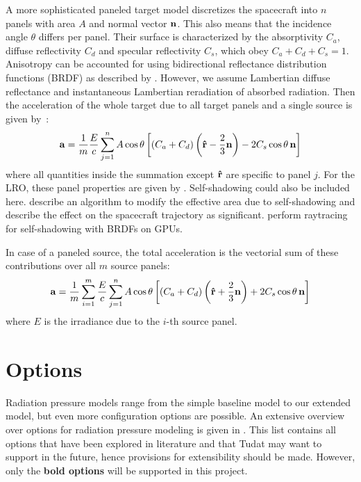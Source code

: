\documentclass[parskip=full,DIV=15]{scrartcl}
\begin{document}
A more sophisticated paneled target model discretizes the spacecraft into $n$ panels with area $A$ and normal vector $\vb n$. This also means that the incidence angle $\theta$ differs per panel. Their surface is characterized by the absorptivity $C_a$, diffuse reflectivity $C_d$ and specular reflectivity $C_s$, which obey $C_a + C_d + C_s = 1$. Anisotropy can be accounted for using bidirectional reflectance distribution functions (BRDF) as described by \textcite{Wetterer2014}. However, we assume Lambertian diffuse reflectance and instantaneous Lambertian reradiation of absorbed radiation.  Then the acceleration of the whole target due to all target panels and a single source is given by~\cite{Montenbruck2014}:
\begin{align}
   \vb a = \frac{1}{m} \frac{E}{c} \sum_{j=1}^n A \cos\theta \left[(C_a + C_d)\left(\vu r - \frac{2}{3} \vb n\right) - 2 C_s \cos\theta \, \vb n \right]
\end{align}
where all quantities inside the summation except $\vu r$ are specific to panel $j$. For the LRO, these panel properties are given by \textcite{Smith2008}. Self-shadowing could also be included here. \textcite{Mazarico2009} describe an algorithm to modify the effective area due to self-shadowing and describe the effect on the spacecraft trajectory as significant. \textcite{Kenneally2020} perform raytracing for self-shadowing with BRDFs on GPUs.

In case of a paneled source, the total acceleration is the vectorial sum of these contributions over all $m$ source panels:
\begin{align}
   \vb a = \frac{1}{m} \sum_{i=1}^m \frac{E}{c} \sum_{j=1}^n A \cos\theta \left[(C_a + C_d)\left(\vu r + \frac{2}{3} \vb n\right) + 2 C_s \cos\theta \, \vb n \right]
\end{align}
where $E$ is the irradiance due to the $i$-th source panel.







\section{Options}
Radiation pressure models range from the simple baseline model to our extended model, but even more configuration options are possible. An extensive overview over options for radiation pressure modeling is given in \cite[Sec.~2]{Vielberg2020}. This list contains all options that have been explored in literature and that Tudat may want to support in the future, hence provisions for extensibility should be made. However, only the \textbf{bold options} will be supported in this project.
\end{document}
